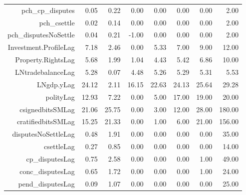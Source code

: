 \begin{table}[ht]
\begin{tabular}{rrrrrrrr}
  pch\_cp\_disputes & 0.05 & 0.22 & 0.00 & 0.00 & 0.00 & 0.00 & 2.00 \\ 
  pch\_csettle & 0.02 & 0.14 & 0.00 & 0.00 & 0.00 & 0.00 & 2.00 \\ 
  pch\_disputesNoSettle & 0.04 & 0.21 & -1.00 & 0.00 & 0.00 & 0.00 & 2.00 \\ 
  Investment.ProfileLag & 7.18 & 2.46 & 0.00 & 5.33 & 7.00 & 9.00 & 12.00 \\ 
  Property.RightsLag & 5.68 & 1.99 & 1.04 & 4.43 & 5.42 & 6.86 & 10.00 \\ 
  LNtradebalanceLag & 5.28 & 0.07 & 4.48 & 5.26 & 5.29 & 5.31 & 5.53 \\ 
  LNgdp.yLag & 24.12 & 2.11 & 16.15 & 22.63 & 24.13 & 25.64 & 29.28 \\ 
  polityLag & 12.93 & 7.22 & 0.00 & 5.00 & 17.00 & 19.00 & 20.00 \\ 
  csignedbitsSMLag & 21.06 & 25.75 & 0.00 & 3.00 & 12.00 & 28.00 & 180.00 \\ 
  cratifiedbitsSMLag & 15.25 & 21.33 & 0.00 & 1.00 & 6.00 & 21.00 & 156.00 \\ 
  disputesNoSettleLag & 0.48 & 1.91 & 0.00 & 0.00 & 0.00 & 0.00 & 35.00 \\ 
  csettleLag & 0.27 & 0.85 & 0.00 & 0.00 & 0.00 & 0.00 & 14.00 \\ 
  cp\_disputesLag & 0.75 & 2.58 & 0.00 & 0.00 & 0.00 & 1.00 & 49.00 \\ 
  conc\_disputesLag & 0.65 & 1.72 & 0.00 & 0.00 & 0.00 & 1.00 & 24.00 \\ 
  pend\_disputesLag & 0.09 & 1.07 & 0.00 & 0.00 & 0.00 & 0.00 & 25.00 \\ 
   \hline
\end{tabular}
\end{table}
